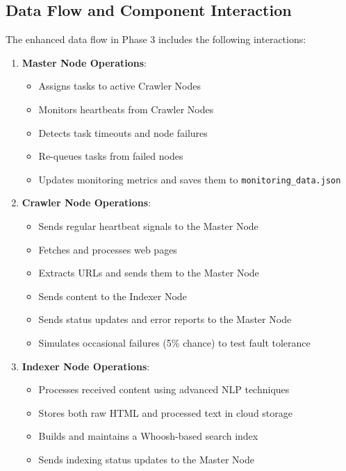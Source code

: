 \documentclass[12pt]{article}
\begin{document}
\subsection{Data Flow and Component Interaction}
The enhanced data flow in Phase 3 includes the following interactions:

\begin{enumerate}
    \item \textbf{Master Node Operations}:
    \begin{itemize}
        \item Assigns tasks to active Crawler Nodes
        \item Monitors heartbeats from Crawler Nodes
        \item Detects task timeouts and node failures
        \item Re-queues tasks from failed nodes
        \item Updates monitoring metrics and saves them to \texttt{monitoring\_data.json}
    \end{itemize}
    
    \item \textbf{Crawler Node Operations}:
    \begin{itemize}
        \item Sends regular heartbeat signals to the Master Node
        \item Fetches and processes web pages
        \item Extracts URLs and sends them to the Master Node
        \item Sends content to the Indexer Node
        \item Sends status updates and error reports to the Master Node
        \item Simulates occasional failures (5\% chance) to test fault tolerance
    \end{itemize}
    
    \item \textbf{Indexer Node Operations}:
    \begin{itemize}
        \item Processes received content using advanced NLP techniques
        \item Stores both raw HTML and processed text in cloud storage
        \item Builds and maintains a Whoosh-based search index
        \item Sends indexing status updates to the Master Node
    \end{itemize}
    

\end{enumerate}
\end{document}
